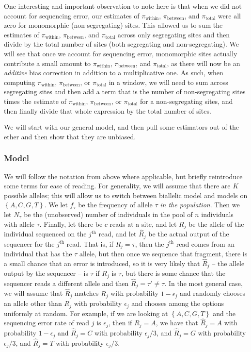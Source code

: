 \documentclass[a4paper,fontsize=9pt,DIV=14]{scrartcl}
\newcommand*{\piw}{$\pi_\text{within}$\xspace}
\newcommand*{\pib}{$\pi_\text{between}$\xspace}
\newcommand*{\pit}{$\pi_\text{total}$\xspace}
\begin{document}
One interesting and important observation to note here is that when we did not account for sequencing error, our estimates of \piw, \pib, and \pit were all zero for monomorphic (non-segregating) sites.  This allowed us to sum the estimates of \piw, \pib, and \pit across only segregating sites and then divide by the total number of sites (both segregating and non-segregating).  We will see that once we account for sequencing error, monomorphic sites actually contribute a small amount to \piw, \pib, and \pit, as there will now be an \emph{additive} bias correction in addition to a multiplicative one.  As such, when computing \piw, \pib, or \pit in a window, we will need to sum across segregating sites and then add a term that is the number of non-segregating sites times the estimate of \piw, \pib, or \pit for a non-segregating sites, and then finally divide that whole expression by the total number of sites.

We will start with our general model, and then pull some estimators out of the ether and then show that they are unbiased.  


\subsubsection*{Model}
\label{supp:sec:FST:sub:HeterozygositySequencingError:sub:Model}

We will follow the notation from above where applicable, but briefly reintroduce some terms for ease of reading.  For generality, we will assume that there are $K$ possible alleles; this will allow us to switch between biallelic model and models on $\left\{A, C, G, T\right\}$.  We let $f_\tau$ be the frequency of allele $\tau$ \emph{in the population}.  Then we let $N_\tau$ be the (unobserved) number of individuals in the pool of $n$ individuals with allele $\tau$.  Finally, let there be $c$ reads at a site, and let $R_j$ be the allele of the individual sequenced on the $j^\text{th}$ read, and let $\hat{R}_j$ be the actual output of the sequencer for the $j^\text{th}$ read.  That is, if $R_j = \tau$, then the $j^\text{th}$ read comes from an individual that has the $\tau$ allele, but then once we sequence that fragment, there is a small chance that an error is introduced, so it is very likely that $\hat{R}_j$ -- the allele output by the sequencer -- is $\tau$ if $R_j$ is $\tau$, but there is some chance that the sequencer reads a different allele and then $\hat{R}_j = \tau' \ne \tau$.  In the most general case, we will assume that $\hat{R}_j$ matches $R_j$ with probability $1 - \epsilon_j$ and randomly chooses an allele other than $R_j$ with probability $\epsilon_j$ and chooses among the options uniformly at random.  For example, if we are looking at  $\left\{A, C, G, T\right\}$ and the sequencing error rate of read $j$ is $\epsilon_j$, then if $R_j = A$, we have that $\hat{R}_j = A$ with probability $1 - \epsilon_j$ and $\hat{R}_j = C$ with probability $\epsilon_j/3$, and $\hat{R}_j = G$ with probability $\epsilon_j/3$, and $\hat{R}_j = T$ with probability $\epsilon_j/3$.
\end{document}
